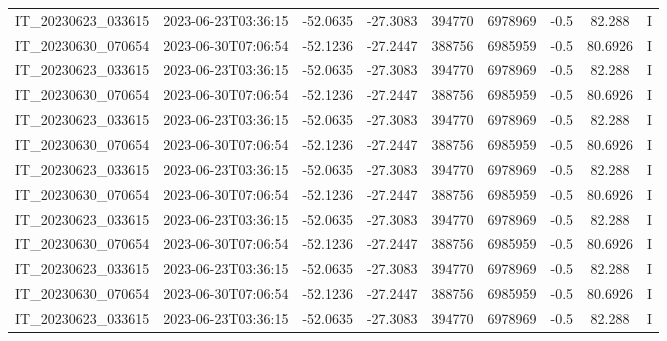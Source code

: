 \begin{small}
\begin{longtable}{ccccccccc}
IT\_20230623\_033615 & 2023-06-23T03:36:15 & -52.0635 & -27.3083 & 394770 & 6978969 & -0.5 & \num[round-precision=3,round-mode=figures,scientific-notation=true]{82.288} & I \\
IT\_20230630\_070654 & 2023-06-30T07:06:54 & -52.1236 & -27.2447 & 388756 & 6985959 & -0.5 & \num[round-precision=3,round-mode=figures,scientific-notation=true]{80.6926} & I \\
IT\_20230623\_033615 & 2023-06-23T03:36:15 & -52.0635 & -27.3083 & 394770 & 6978969 & -0.5 & \num[round-precision=3,round-mode=figures,scientific-notation=true]{82.288} & I \\
IT\_20230630\_070654 & 2023-06-30T07:06:54 & -52.1236 & -27.2447 & 388756 & 6985959 & -0.5 & \num[round-precision=3,round-mode=figures,scientific-notation=true]{80.6926} & I \\
IT\_20230623\_033615 & 2023-06-23T03:36:15 & -52.0635 & -27.3083 & 394770 & 6978969 & -0.5 & \num[round-precision=3,round-mode=figures,scientific-notation=true]{82.288} & I \\
IT\_20230630\_070654 & 2023-06-30T07:06:54 & -52.1236 & -27.2447 & 388756 & 6985959 & -0.5 & \num[round-precision=3,round-mode=figures,scientific-notation=true]{80.6926} & I \\
IT\_20230623\_033615 & 2023-06-23T03:36:15 & -52.0635 & -27.3083 & 394770 & 6978969 & -0.5 & \num[round-precision=3,round-mode=figures,scientific-notation=true]{82.288} & I \\
IT\_20230630\_070654 & 2023-06-30T07:06:54 & -52.1236 & -27.2447 & 388756 & 6985959 & -0.5 & \num[round-precision=3,round-mode=figures,scientific-notation=true]{80.6926} & I \\
IT\_20230623\_033615 & 2023-06-23T03:36:15 & -52.0635 & -27.3083 & 394770 & 6978969 & -0.5 & \num[round-precision=3,round-mode=figures,scientific-notation=true]{82.288} & I \\
IT\_20230630\_070654 & 2023-06-30T07:06:54 & -52.1236 & -27.2447 & 388756 & 6985959 & -0.5 & \num[round-precision=3,round-mode=figures,scientific-notation=true]{80.6926} & I \\
IT\_20230623\_033615 & 2023-06-23T03:36:15 & -52.0635 & -27.3083 & 394770 & 6978969 & -0.5 & \num[round-precision=3,round-mode=figures,scientific-notation=true]{82.288} & I \\
IT\_20230630\_070654 & 2023-06-30T07:06:54 & -52.1236 & -27.2447 & 388756 & 6985959 & -0.5 & \num[round-precision=3,round-mode=figures,scientific-notation=true]{80.6926} & I \\
IT\_20230623\_033615 & 2023-06-23T03:36:15 & -52.0635 & -27.3083 & 394770 & 6978969 & -0.5 & \num[round-precision=3,round-mode=figures,scientific-notation=true]{82.288} & I \\

\end{longtable}
\end{small}
